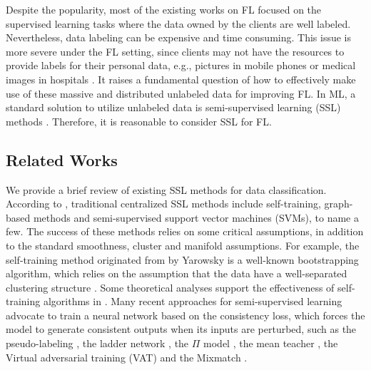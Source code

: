 \documentclass[twoside,journal]{IEEEtran}
\begin{document}
Despite the popularity, most of the existing works on FL focused on the supervised learning tasks where the data owned by the clients are well labeled.
Nevertheless, data labeling can be expensive
and time consuming. %
This issue is more severe under the FL setting, since
clients may not have the resources to provide labels for their personal data, e.g., pictures in mobile phones or medical images in hospitals \cite{cohen2004}.
It raises a fundamental question of how to effectively make use of these massive and distributed unlabeled data for improving FL.
In ML, a standard solution to utilize unlabeled data is semi-supervised learning (SSL) methods \cite{cohen2004,zhu2005,chapelle2009}.
Therefore, it is reasonable to consider  SSL for FL.
\vspace{-0.3cm}
\subsection{Related Works}
We provide a brief review of existing SSL methods for data classification.
According to \cite{zhu2005,chapelle2009}, traditional centralized SSL methods include self-training, graph-based methods and semi-supervised support vector machines (SVMs), to name a few.
The success of these methods relies on some critical assumptions, in addition to the standard smoothness, cluster and manifold assumptions.
For example,  the self-training method originated from \cite{yarowsky1995unsupervised} by Yarowsky is a well-known bootstrapping algorithm, which relies on the assumption that  the data have a well-separated clustering structure \cite{zhu2005}. Some theoretical analyses support the effectiveness of self-training algorithms in \cite{abney2004understanding,haffari2007analysis}. Many recent approaches for semi-supervised learning advocate to train a neural network based on the consistency loss, which forces the model to generate consistent outputs when its inputs are perturbed, such as the pseudo-labeling \cite{lee2013pseudo}, the ladder network \cite{rasmus2015}, the $\Pi$ model \cite{laine2016}, the mean teacher \cite{tarvainen2017}, the Virtual adversarial training (VAT) \cite{miyato2018virtual} and the Mixmatch \cite{berthelot2019mixmatch}.
\end{document}
